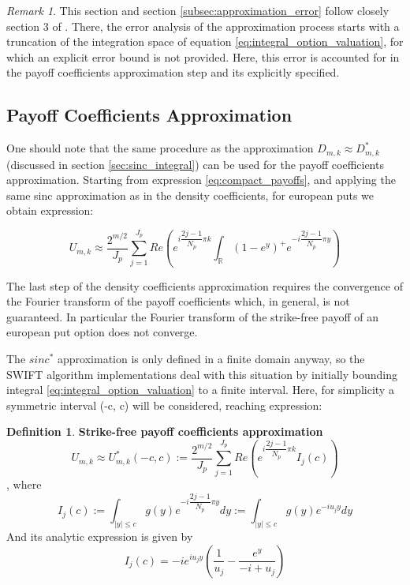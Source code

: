 \documentclass[12,twoside]{mammeTFM}
\theoremstyle{definition}
\newtheorem{definition}[thm]{Definition}
\theoremstyle{remark}
\newtheorem{remark}[thm]{Remark}
\newcommand{\R}{\ensuremath{\mathbb{R}}}
\begin{document}
\begin{remark}
This section and section \ref{subsec:approximation_error} follow closely section 3 of \cite{mar17}. There, the error analysis of the approximation process starts with a truncation of the integration space of equation  \ref{eq:integral_option_valuation}, for which an explicit error bound is not provided. Here, this error is accounted for in the payoff coefficients approximation step and its explicitly specified.
\end{remark}

\subsection{Payoff Coefficients Approximation} \label{subsec:payoff_coefficients}
One should note that the same procedure as the approximation $D_{m,k} \approx D_{m,k}^{*}$ (discussed in section \ref{sec:sinc_integral}) can be used for the payoff coefficients approximation. Starting from expression \ref{eq:compact_payoffs}, and applying the same sinc approximation as in the density coefficients, for european puts we obtain expression:

\begin{equation}
U_{m,k} \approx \dfrac{2^{m/2}}{J_p}\sum_{j=1}^{J_p} Re \left( e^{i \dfrac{2j - 1}{N_p} \pi k} \int_{\R} (1 - e^y)^{+} e^{-i \dfrac{2j - 1}{N_p} \pi y} \right)
\end{equation}

The last step of the density coefficients approximation requires the convergence of the Fourier transform of the payoff coefficients which, in general, is not guaranteed. In particular the Fourier transform of the strike-free payoff of an european put option does not converge.

The $sinc^{*}$ approximation is only defined in a finite domain anyway, so the SWIFT algorithm implementations deal with this situation by initially bounding integral \ref{eq:integral_option_valuation} to a finite interval. Here, for simplicity a symmetric interval (-c, c) will be considered, reaching expression:

\begin{definition} \textbf{Strike-free payoff coefficients approximation}
\begin{equation}
U_{m,k} \approx U_{m,k}^{*}(-c, c) := \dfrac{2^{m/2}}{J_p}\sum_{j=1}^{J_p} Re \left(e^{i \dfrac{2j - 1}{N_p} \pi k} I_{j}(c)\right)
\end{equation}
, where
\begin{equation} \label{eq:strike_free_int}
I_{j}(c) := \int_{|y| \leq c} g(y) e^{-i \dfrac{2j - 1}{N_p} \pi y} dy := \int_{|y| \leq c} g(y) e^{-i u_j y} dy
\end{equation}
And its analytic expression is given by
\begin{equation}
I_{j}(c) = -i e^{i u_j y} \left(\dfrac{1}{u_j} - \dfrac{e^y}{-i + u_j}\right)
\end{equation}
\end{definition}
\end{document}
